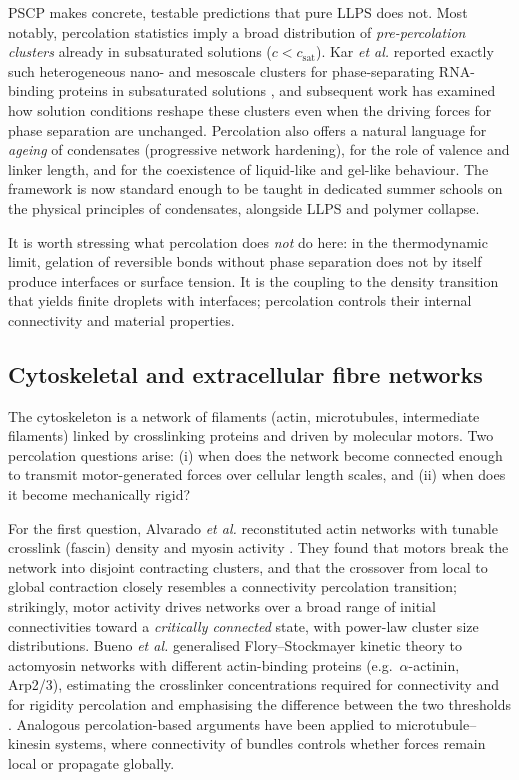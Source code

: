 \documentclass[11pt]{article}
\begin{document}
PSCP makes concrete, testable predictions that pure LLPS does not. Most notably, percolation statistics imply a broad distribution of \emph{pre-percolation clusters} already in subsaturated solutions ($c<c_{\text{sat}}$). Kar \emph{et al.} reported exactly such heterogeneous nano- and mesoscale clusters for phase-separating RNA-binding proteins in subsaturated solutions \cite{Kar2022}, and subsequent work has examined how solution conditions reshape these clusters even when the driving forces for phase separation are unchanged. Percolation also offers a natural language for \emph{ageing} of condensates (progressive network hardening), for the role of valence and linker length, and for the coexistence of liquid-like and gel-like behaviour. The framework is now standard enough to be taught in dedicated summer schools on the physical principles of condensates, alongside LLPS and polymer collapse.

It is worth stressing what percolation does \emph{not} do here: in the thermodynamic limit, gelation of reversible bonds without phase separation does not by itself produce interfaces or surface tension. It is the coupling to the density transition that yields finite droplets with interfaces; percolation controls their internal connectivity and material properties.

\subsection{Cytoskeletal and extracellular fibre networks}

The cytoskeleton is a network of filaments (actin, microtubules, intermediate filaments) linked by crosslinking proteins and driven by molecular motors. Two percolation questions arise: (i) when does the network become connected enough to transmit motor-generated forces over cellular length scales, and (ii) when does it become mechanically rigid?

For the first question, Alvarado \emph{et al.} reconstituted actin networks with tunable crosslink (fascin) density and myosin activity \cite{Alvarado2013}. They found that motors break the network into disjoint contracting clusters, and that the crossover from local to global contraction closely resembles a connectivity percolation transition; strikingly, motor activity drives networks over a broad range of initial connectivities toward a \emph{critically connected} state, with power-law cluster size distributions. Bueno \emph{et al.} generalised Flory--Stockmayer kinetic theory to actomyosin networks with different actin-binding proteins (e.g.\ $\alpha$-actinin, Arp2/3), estimating the crosslinker concentrations required for connectivity and for rigidity percolation and emphasising the difference between the two thresholds \cite{Bueno2022}. Analogous percolation-based arguments have been applied to microtubule--kinesin systems, where connectivity of bundles controls whether forces remain local or propagate globally.
\end{document}
